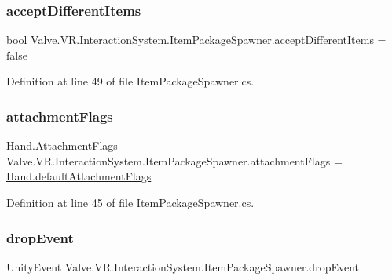 \subsubsection{\texorpdfstring{acceptDifferentItems}{acceptDifferentItems}}
{\footnotesize\ttfamily bool Valve.\+V\+R.\+Interaction\+System.\+Item\+Package\+Spawner.\+accept\+Different\+Items = false}



Definition at line 49 of file Item\+Package\+Spawner.\+cs.

\mbox{\label{class_valve_1_1_v_r_1_1_interaction_system_1_1_item_package_spawner_af9263180785d93503cd8b0bc05d4c2ea}} 
\subsubsection{\texorpdfstring{attachmentFlags}{attachmentFlags}}
{\footnotesize\ttfamily \mbox{\hyperlink{class_valve_1_1_v_r_1_1_interaction_system_1_1_hand_a61701f82b8f3fac8818954ec71804cb5}{Hand.\+Attachment\+Flags}} Valve.\+V\+R.\+Interaction\+System.\+Item\+Package\+Spawner.\+attachment\+Flags = \mbox{\hyperlink{class_valve_1_1_v_r_1_1_interaction_system_1_1_hand_a836a6cb55d2514dbed680981dfcc5505}{Hand.\+default\+Attachment\+Flags}}}



Definition at line 45 of file Item\+Package\+Spawner.\+cs.

\mbox{\label{class_valve_1_1_v_r_1_1_interaction_system_1_1_item_package_spawner_adffe0a0db412218c6f2809234b4a2569}} 
\subsubsection{\texorpdfstring{dropEvent}{dropEvent}}
{\footnotesize\ttfamily Unity\+Event Valve.\+V\+R.\+Interaction\+System.\+Item\+Package\+Spawner.\+drop\+Event}



